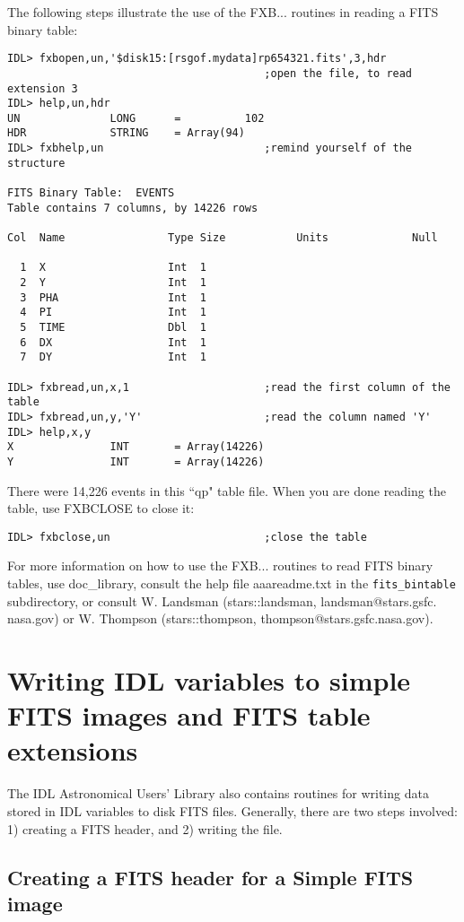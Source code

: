 The following steps illustrate the use of the FXB... routines in reading a
FITS binary table:

\medskip\noindent
\begin{verbatim}
IDL> fxbopen,un,'$disk15:[rsgof.mydata]rp654321.fits',3,hdr
                                        ;open the file, to read extension 3
IDL> help,un,hdr
UN              LONG      =          102
HDR             STRING    = Array(94)
IDL> fxbhelp,un                         ;remind yourself of the structure
 
FITS Binary Table:  EVENTS
Table contains 7 columns, by 14226 rows
 
Col  Name                Type Size           Units             Null
 
  1  X                   Int  1
  2  Y                   Int  1
  3  PHA                 Int  1
  4  PI                  Int  1
  5  TIME                Dbl  1
  6  DX                  Int  1
  7  DY                  Int  1
 
IDL> fxbread,un,x,1                     ;read the first column of the table
IDL> fxbread,un,y,'Y'                   ;read the column named 'Y'
IDL> help,x,y
X               INT       = Array(14226)
Y               INT       = Array(14226)
\end{verbatim}
There were 14,226 events in this ``qp" table file. When you are done reading
the table, use FXBCLOSE to close it:

\medskip\noindent
\begin{verbatim}
IDL> fxbclose,un                        ;close the table
\end{verbatim}
For more information on how to use the FXB... routines to read FITS binary
tables, use doc{\_}library, consult the help file aaareadme.txt in the
{\tt fits{\_}bintable} subdirectory, or consult W. Landsman (stars::landsman,
landsman@stars.gsfc. nasa.gov) or W. Thompson (stars::thompson,
thompson@stars.gsfc.nasa.gov).
 

\section{Writing IDL variables to simple FITS images and FITS table extensions}
 
The IDL Astronomical Users' Library also contains routines for writing data
stored in IDL variables to disk FITS files. Generally, there are two steps
involved: 1) creating a FITS header, and 2) writing the file.
 

\subsection{Creating a FITS header for a Simple FITS image}
 
